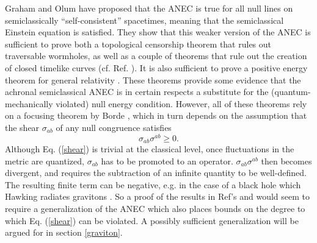 \documentclass[11pt]{article}
\begin{document}
Graham and Olum \cite{GO07} have proposed that the ANEC is true for all null lines on semiclassically ``self-consistent'' spacetimes, meaning that the semiclassical Einstein equation is satisfied.  They show that this weaker version of the ANEC is sufficient to prove both a topological censorship theorem that rules out traversable wormholes, as well as a couple of theorems that rule out the creation of closed timelike curves (cf. Ref. \cite{minguzzi08}).  It is also sufficient to prove a positive energy theorem for general relativity \cite{PSW93}.  These theorems provide some evidence that the achronal semiclassical ANEC is in certain respects a substitute for the (quantum-mechanically violated) null energy condition.  However, all of these theorems rely on a focusing theorem by Borde \cite{borde87}, which in turn depends on the assumption that the shear $\sigma_{ab}$ of any null congruence satisfies
\begin{equation}\label{shear}
\sigma_{ab}\sigma^{ab} \ge 0.
\end{equation}
Although Eq. (\ref{shear}) is trivial at the classical level, once fluctuations in the metric are quantized, $\sigma_{ab}$ has to be promoted to an operator.  $\sigma_{ab}\sigma^{ab}$ then becomes divergent, and requires the subtraction of an infinite quantity to be well-defined.  The resulting finite term can be negative, e.g. in the case of a black hole which Hawking radiates gravitons \cite{CS77}.  So a proof of the results in Ref's \cite{GO07} and \cite{PSW93} would seem to require a generalization of the ANEC which also places bounds on the degree to which Eq. (\ref{shear}) can be violated.  A possibly sufficient generalization will be argued for in section \ref{graviton}.
\end{document}
